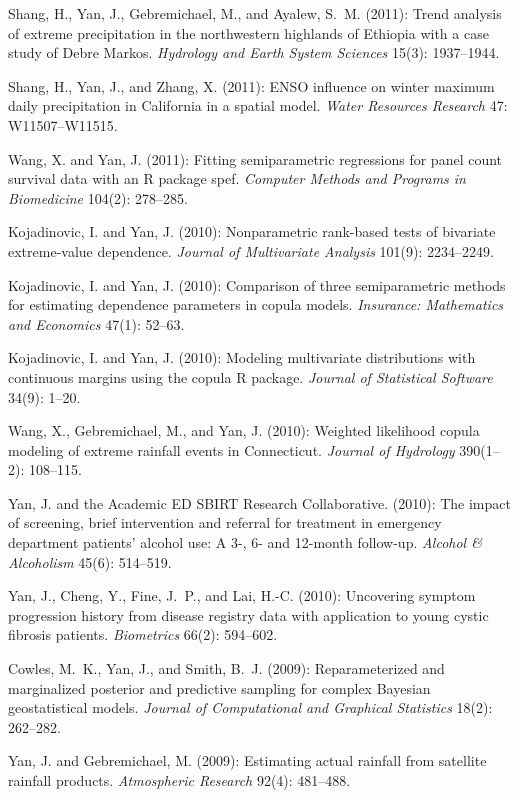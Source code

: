 \documentclass[Statistics]{vita}
\begin{document}
\begin{vita}
\begin{Publications}
\begin{RefereedJournalArticles}
  \item *Shang, H., Yan, J., Gebremichael, M., and Ayalew, S.~M. (2011): Trend analysis of extreme precipitation in the northwestern highlands of Ethiopia with a case study of Debre Markos. {\em Hydrology and Earth System Sciences\/} 15(3): 1937--1944.
  \item *Shang, H., Yan, J., and Zhang, X. (2011): ENSO influence on winter maximum daily precipitation in California in a spatial model. {\em Water Resources Research\/} 47: W11507--W11515.
  \item *Wang, X. and Yan, J. (2011): Fitting semiparametric regressions for panel count survival data with an {R} package {spef}. {\em Computer Methods and Programs in Biomedicine\/} 104(2): 278--285.
  \item Kojadinovic, I. and Yan, J. (2010): Nonparametric rank-based tests of bivariate extreme-value dependence. {\em Journal of Multivariate Analysis\/} 101(9): 2234--2249.
  \item Kojadinovic, I. and Yan, J. (2010): Comparison of three semiparametric methods for estimating dependence parameters in copula models. {\em Insurance: Mathematics and Economics\/} 47(1): 52--63.
  \item Kojadinovic, I. and Yan, J. (2010): Modeling multivariate distributions with continuous margins using the copula R package. {\em Journal of Statistical Software\/} 34(9): 1--20.
  \item *Wang, X., Gebremichael, M., and Yan, J. (2010): Weighted likelihood copula modeling of extreme rainfall events in Connecticut. {\em Journal of Hydrology\/} 390(1--2): 108--115.
  \item Yan, J. and the Academic ED SBIRT Research Collaborative. (2010): The impact of screening, brief intervention and referral for treatment in emergency department patients' alcohol use: A 3-, 6- and 12-month follow-up. {\em Alcohol \& Alcoholism\/} 45(6): 514--519.
  \item Yan, J., Cheng, Y., Fine, J.~P., and Lai, H.-C. (2010): Uncovering symptom progression history from disease registry data with application to young cystic fibrosis patients. {\em Biometrics\/} 66(2): 594--602.
  \item Cowles, M.~K., Yan, J., and Smith, B.~J. (2009): Reparameterized and marginalized posterior and predictive sampling for complex Bayesian geostatistical models. {\em Journal of Computational and Graphical Statistics\/} 18(2): 262--282.
  \item Yan, J. and Gebremichael, M. (2009): Estimating actual rainfall from satellite rainfall products. {\em Atmospheric Research\/} 92(4): 481--488.

\end{RefereedJournalArticles}
\end{Publications}
\end{vita}
\end{document}
